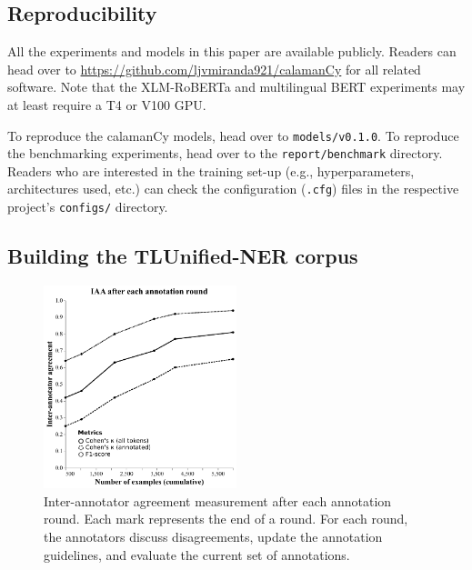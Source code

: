 \documentclass[11pt]{article}
\begin{document}
\subsection{Reproducibility}


All the experiments and models in this paper are available publicly. 
Readers can head over to \url{https://github.com/ljvmiranda921/calamanCy} for all related software.
Note that the XLM-RoBERTa and multilingual BERT experiments may at least require a T4 or V100 GPU.

To reproduce the calamanCy models, head over to \texttt{models/v0.1.0}.
To reproduce the benchmarking experiments, head over to the \texttt{report/benchmark} directory.
Readers who are interested in the training set-up (e.g., hyperparameters, architectures used, etc.) can check the configuration (\texttt{.cfg}) files in the respective project's \texttt{configs/} directory.

\subsection{Building the TLUnified-NER corpus}



\begin{figure}[t]
\centering
\includegraphics[width=0.5\textwidth]{images/iaa}
\caption{
  Inter-annotator agreement measurement after each annotation round.
  Each mark represents the end of a round. 
  For each round, the annotators discuss disagreements, update the annotation guidelines, and evaluate the current set of annotations.
}
\label{fig:iaa}
\end{figure}
\end{document}
